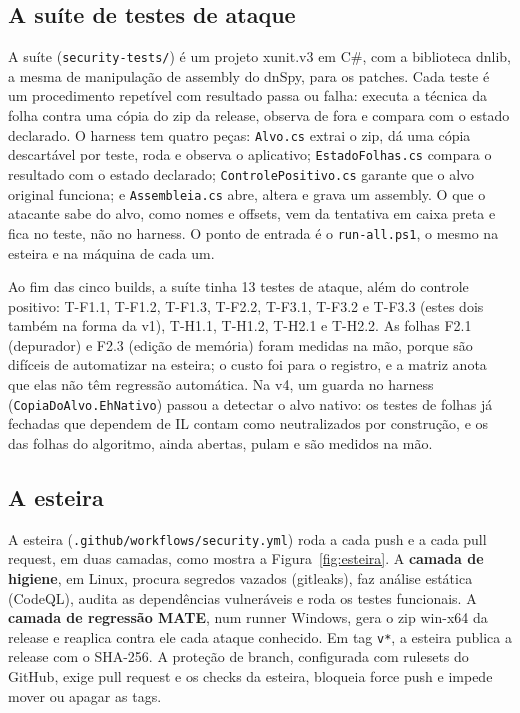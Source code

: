 \subsection{A suíte de testes de ataque}

A suíte (\texttt{security-tests/}) é um projeto xunit.v3 em C\#, com a biblioteca dnlib, a mesma de manipulação de assembly do dnSpy, para os patches. Cada teste é um procedimento repetível com resultado passa ou falha: executa a técnica da folha contra uma cópia do zip da release, observa de fora e compara com o estado declarado. O harness tem quatro peças: \texttt{Alvo.cs} extrai o zip, dá uma cópia descartável por teste, roda e observa o aplicativo; \texttt{EstadoFolhas.cs} compara o resultado com o estado declarado; \texttt{ControlePositivo.cs} garante que o alvo original funciona; e \texttt{Assembleia.cs} abre, altera e grava um assembly. O que o atacante sabe do alvo, como nomes e offsets, vem da tentativa em caixa preta e fica no teste, não no harness. O ponto de entrada é o \texttt{run-all.ps1}, o mesmo na esteira e na máquina de cada um.

Ao fim das cinco builds, a suíte tinha 13 testes de ataque, além do controle positivo: T-F1.1, T-F1.2, T-F1.3, T-F2.2, T-F3.1, T-F3.2 e T-F3.3 (estes dois também na forma da v1), T-H1.1, T-H1.2, T-H2.1 e T-H2.2. As folhas F2.1 (depurador) e F2.3 (edição de memória) foram medidas na mão, porque são difíceis de automatizar na esteira; o custo foi para o registro, e a matriz anota que elas não têm regressão automática. Na v4, um guarda no harness (\texttt{CopiaDoAlvo.EhNativo}) passou a detectar o alvo nativo: os testes de folhas já fechadas que dependem de IL contam como neutralizados por construção, e os das folhas do algoritmo, ainda abertas, pulam e são medidos na mão.

\subsection{A esteira}

A esteira (\texttt{.github/workflows/security.yml}) roda a cada push e a cada pull request, em duas camadas, como mostra a Figura~\ref{fig:esteira}. A \textbf{camada de higiene}, em Linux, procura segredos vazados (gitleaks), faz análise estática (CodeQL), audita as dependências vulneráveis e roda os testes funcionais. A \textbf{camada de regressão MATE}, num runner Windows, gera o zip win-x64 da release e reaplica contra ele cada ataque conhecido. Em tag \texttt{v*}, a esteira publica a release com o SHA-256. A proteção de branch, configurada com rulesets do GitHub, exige pull request e os checks da esteira, bloqueia force push e impede mover ou apagar as tags.

